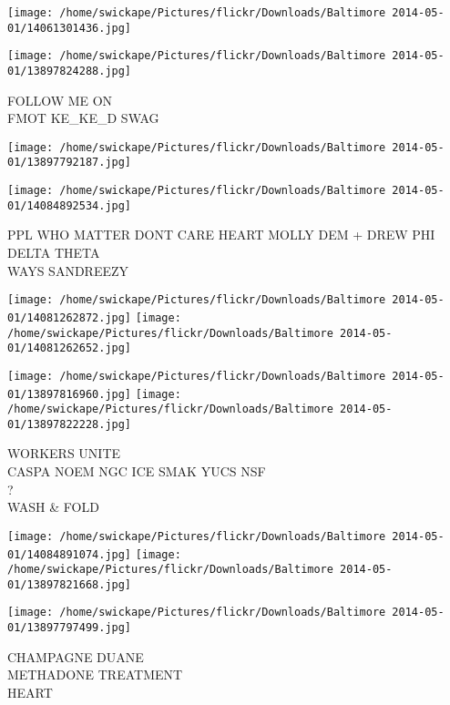 \documentclass[10pt,letterpaper]{article}
\begin{document}
\texttt{[image: /home/swickape/Pictures/flickr/Downloads/Baltimore 2014-05-01/14061301436.jpg]}

\vspace{0.25in}
\texttt{[image: /home/swickape/Pictures/flickr/Downloads/Baltimore 2014-05-01/13897824288.jpg]}

FOLLOW ME ON\\
FMOT KE\_KE\_D SWAG\\
\pagebreak

\texttt{[image: /home/swickape/Pictures/flickr/Downloads/Baltimore 2014-05-01/13897792187.jpg]}

\vspace{0.25in}
\texttt{[image: /home/swickape/Pictures/flickr/Downloads/Baltimore 2014-05-01/14084892534.jpg]}

PPL WHO MATTER DONT CARE HEART MOLLY DEM + DREW PHI DELTA THETA\\
WAYS SANDREEZY\\
\pagebreak

\texttt{[image: /home/swickape/Pictures/flickr/Downloads/Baltimore 2014-05-01/14081262872.jpg]}
\texttt{[image: /home/swickape/Pictures/flickr/Downloads/Baltimore 2014-05-01/14081262652.jpg]}

\texttt{[image: /home/swickape/Pictures/flickr/Downloads/Baltimore 2014-05-01/13897816960.jpg]}
\texttt{[image: /home/swickape/Pictures/flickr/Downloads/Baltimore 2014-05-01/13897822228.jpg]}

WORKERS UNITE\\
CASPA NOEM NGC ICE SMAK YUCS NSF\\
?\\
WASH \& FOLD\\
\pagebreak

\texttt{[image: /home/swickape/Pictures/flickr/Downloads/Baltimore 2014-05-01/14084891074.jpg]}
\texttt{[image: /home/swickape/Pictures/flickr/Downloads/Baltimore 2014-05-01/13897821668.jpg]}

\vspace{0.25in}
\texttt{[image: /home/swickape/Pictures/flickr/Downloads/Baltimore 2014-05-01/13897797499.jpg]}

CHAMPAGNE DUANE\\
METHADONE TREATMENT\\
HEART\\
\pagebreak
\end{document}
